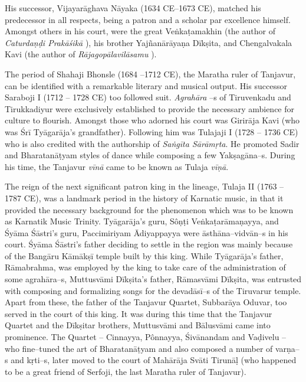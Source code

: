His successor, Vijayarāghava Nāyaka (1634 CE–1673 CE), matched his predecessor in all respects, being a patron and a scholar par excellence himself. Amongst others in his court, were the great Veṅkaṭamakhin (the author of \textit{Caturdaṇḍi Prakāśikā} ), his brother Yajñanārāyaṇa Dīkṣita, and Chengalvakala Kavi (the author of \textit{Rājagopālavilāsamu} ).

The period of Shahaji Bhonsle (1684 –1712 CE), the Maratha ruler of Tanjavur, can be identified with a remarkable literary and musical output. His successor Saraboji I (1712 – 1728 CE) too followed suit. \textit{Agrahāra} –s of Tiruvenkadu and Tirukkadiyur were exclusively established to provide the necessary ambience for culture to flourish. Amongst those who adorned his court was Girirāja Kavi (who was Śrī Tyāgarāja’s grandfather). Following him was Tulajaji I (1728 – 1736 CE) who is also credited with the authorship of \textit{Saṅgīta Sārāmṛta}. He promoted Sadir and Bharatanāṭyam styles of dance while composing a few Yakṣagāna–s. During his time, the Tanjavur \textit{vīnā} came to be known as Tulaja \textit{vīṇā}.

The reign of the next significant patron king in the lineage, Tulaja II (1763 – 1787 CE), was a landmark period in the history of Karnatic music, in that it provided the necessary background for the phenomenon which was to be known as Karnatik Music Trinity. Tyāgarāja’s guru, Sôṇṭi Veṅkaṭarāmaṇayya, and Śyāma Śāstri’s guru, Paccimiriyam Ādiyappayya were āsthāna–vidvān–s in his court. Śyāma Śāstri’s father deciding to settle in the region was mainly because of the Bangāru Kāmākṣī temple built by this king. While Tyāgarāja’s father, Rāmabrahma, was employed by the king to take care of the administration of some agrahāra–s, Muttusvāmi Dīkṣita’s father, Rāmasvāmi Dīkṣita, was entrusted with composing and formalizing songs for the devadāsī–s of the Tiruvarur temple. Apart from these, the father of the Tanjavur Quartet, Subbarāya Oduvar, too served in the court of this king. It was during this time that the Tanjavur Quartet and the Dīkṣitar brothers, Muttusvāmi and Bālusvāmi came into prominence. The Quartet – Cinnayya, Pônnayya, Śivānandam and Vaḍivelu – who fine–tuned the art of Bharatanāṭyam and also composed a number of varṇa–s and kṛti–s, later moved to the court of Mahārāja Svāti Tirunāḷ (who happened to be a great friend of Serfoji, the last Maratha ruler of Tanjavur).


